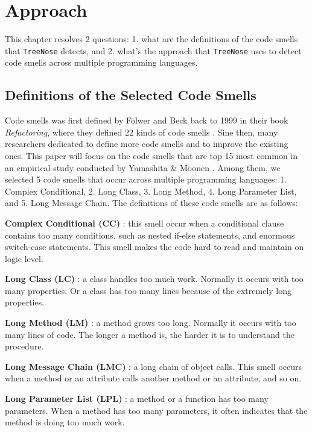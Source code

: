 \section{Approach}
\label{sec:approach}

This chapter resolves 2 questions: 1. what are the definitions of the code smells that \texttt{TreeNose} detects,
and 2. what's the approach that \texttt{TreeNose} uses to detect code smells across multiple programming languages.


\subsection{Definitions of the Selected Code Smells}
\label{sec:Definitions of the Selected Code Smells}

Code smells was first defined by Folwer and Beck back to 1999 in their book \textit{Refactoring},
where they defined 22 kinds of code smells \cite{Fowler_Beck}. Sine then, many researchers dedicated to define more
code smells and to improve the existing ones. This paper will focus on the code smells that are top 15 most common in
an empirical study conducted by Yamashita \& Moonen \cite{developersCare}.
Among them, we selected 5 code smells that occur across multiple programming languages: 1. Complex Conditional, 2. Long Class,
3. Long Method, 4. Long Parameter List, and 5. Long Message Chain. The definitions of these code smells are as follows:

\textbf{Complex Conditional (CC)} \cite{Fowler_Beck}: this smell occur when a conditional clause contains too many conditions,
such as nested if-else statements, and enormous switch-case statements. This smell makes the code hard to read and maintain on logic level.

\textbf{Long Class (LC)} \cite{Fowler_Beck}: a class handles too much work. Normally it occurs with too many properties. Or a class has too many lines because of
the extremely long properties.

\textbf{Long Method (LM)} \cite{Fowler_Beck}: a method grows too long. Normally it occurs with too many lines of code. The longer a method is, the harder it is to understand the procedure.

\textbf{Long Message Chain (LMC)} \cite{Fowler_Beck}: a long chain of object calls. This smell occurs when a method or an attribute calls another method or an attribute, and so on.

\textbf{Long Parameter List (LPL)} \cite{Fowler_Beck}: a method or a function has too many parameters. When a method has too many parameters, it often indicates that the method is doing too much work.

